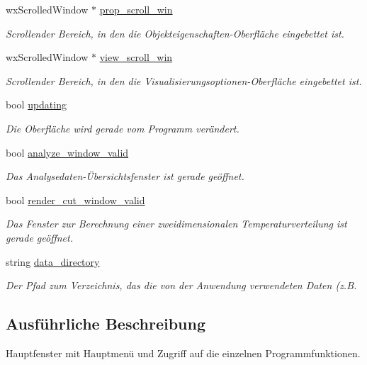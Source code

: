 \begin{DoxyCompactItemize}
wx\-Scrolled\-Window $\ast$ \hyperlink{classGUIMainWindow_a1c120efb232cf3d371a3a6231619b808}{prop\-\_\-scroll\-\_\-win}
\begin{DoxyCompactList}\small\item\em Scrollender Bereich, in den die Objekteigenschaften-\/\-Oberfläche eingebettet ist. \end{DoxyCompactList}\item 
wx\-Scrolled\-Window $\ast$ \hyperlink{classGUIMainWindow_ad440f7451fd3fdabbe48518a89e61e45}{view\-\_\-scroll\-\_\-win}
\begin{DoxyCompactList}\small\item\em Scrollender Bereich, in den die Visualisierungsoptionen-\/\-Oberfläche eingebettet ist. \end{DoxyCompactList}\item 
bool \hyperlink{classGUIMainWindow_afdc35b04c0fe94e4d0080f659ecbce8c}{updating}
\begin{DoxyCompactList}\small\item\em Die Oberfläche wird gerade vom Programm verändert. \end{DoxyCompactList}\item 
bool \hyperlink{classGUIMainWindow_a1f65a053fadac47033fef38c4b0e8a69}{analyze\-\_\-window\-\_\-valid}
\begin{DoxyCompactList}\small\item\em Das Analysedaten-\/Übersichtsfenster ist gerade geöffnet. \end{DoxyCompactList}\item 
bool \hyperlink{classGUIMainWindow_a4f08d8e4294955a3cc0b071dd3cad0d2}{render\-\_\-cut\-\_\-window\-\_\-valid}
\begin{DoxyCompactList}\small\item\em Das Fenster zur Berechnung einer zweidimensionalen Temperaturverteilung ist gerade geöffnet. \end{DoxyCompactList}\item 
string \hyperlink{classGUIMainWindow_a8f8de1643ce13dec12465486509fd834}{data\-\_\-directory}
\begin{DoxyCompactList}\small\item\em Der Pfad zum Verzeichnis, das die von der Anwendung verwendeten Daten (z.\-B. \end{DoxyCompactList}\end{DoxyCompactItemize}


\subsection{Ausführliche Beschreibung}
Hauptfenster mit Hauptmenü und Zugriff auf die einzelnen Programmfunktionen. 

